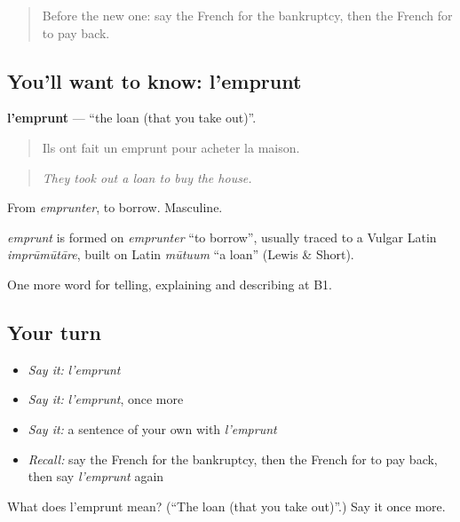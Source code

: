 \label{lesson:FR-C394-emprunt}



\begin{quote}
Before the new one: say the French for the bankruptcy, then the French for to pay back.
\end{quote}

\subsection*{You'll want to know: l'emprunt}
\textbf{l'emprunt} — \textquotedblleft{}the loan (that you take out)\textquotedblright{}.

\begin{quote}
Ils ont fait un emprunt pour acheter la maison.
\end{quote}

\begin{quote}
\emph{They took out a loan to buy the house.}
\end{quote}

From \emph{emprunter}, to borrow. Masculine.

\begin{cousinweb}
\emph{emprunt} is formed on \emph{emprunter} \textquotedblleft{}to borrow\textquotedblright{}, usually traced to a Vulgar Latin \emph{imprūmūtāre}, built on Latin \emph{mūtuum} \textquotedblleft{}a loan\textquotedblright{} (Lewis \& Short).
\end{cousinweb}

\begin{grammarlens}[title={What you've built}]
One more word for telling, explaining and describing at B1.
\end{grammarlens}

\subsection*{Your turn}
\begin{itemize}
\raggedright
  \item \emph{Say it:} \emph{l'emprunt}
  \item \emph{Say it:} \emph{l'emprunt}, once more
  \item \emph{Say it:} a sentence of your own with \emph{l'emprunt}
  \item \emph{Recall:} say the French for the bankruptcy, then the French for to pay back, then say \emph{l'emprunt} again
\end{itemize}

\begin{tcolorbox}[breakable,colback=teal!4,colframe=teal!35!black,title={Before you move on}]
What does l'emprunt mean? (\textquotedblleft{}The loan (that you take out)\textquotedblright{}.) Say it once more.
\end{tcolorbox}
